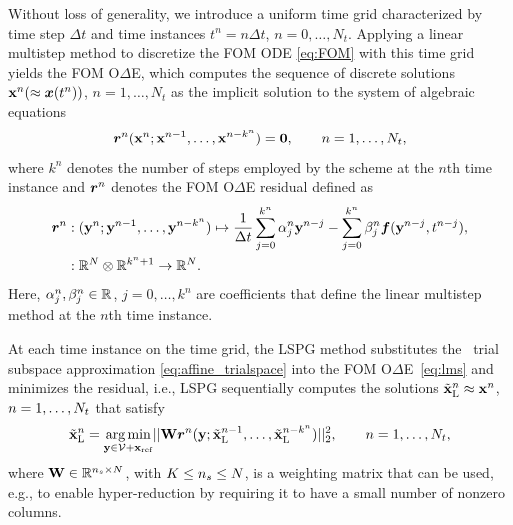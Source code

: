 \documentclass[3p,computermodern,10pt]{elsarticle}
\begin{document}
Without loss of generality, we introduce a uniform time
grid characterized by time step $\Delta t$ and time instances
$t^n = n\Delta
t$, $n=0,\ldots,N_t$.
Applying a linear multistep method to discretize the FOM ODE \eqref{eq:FOM}
with this time grid
yields the FOM O$\Delta$E, which computes the sequence of discrete
solutions
${\mathbf{x}}^{n}( \approx {\boldsymbol x}(t^n))$, $n=1,\ldots,N_t$
as the implicit solution to the system of algebraic equations
\begin{equation}\label{eq:lms}
\boldsymbol r_{}^{n}
	({\mathbf{x}}^{n};{\mathbf{x}}^{n-1},\ldots,{\mathbf{x}}^{n-k^n})
	= \boldsymbol 0,\qquad n=1,\ldots,N_t,
\end{equation}
where  $k^n$ denotes the number of steps employed by the scheme at the $n$th
time instance and 
$\boldsymbol r_{}^{n}$ denotes the FOM O$\Delta$E residual defined as
\begin{align*}
\boldsymbol r_{}^{n} &: (\mathbf{y}^{n};\mathbf{y}^{n-1},\ldots,\mathbf{y}^{n-k^n}) \mapsto  \frac{1}{\Delta t} \sum_{j=0}^{k^n} \alpha^n_j \mathbf{y}^{n-j} -  \sum_{j=0}^{k^n} \beta^n_j \boldsymbol f(\mathbf{y}^{n-j},t^{n-j}),
\\
&: \mathbb{R}^{N} \otimes \mathbb{R}^{k^n + 1} \rightarrow \mathbb{R}^{N}.
\end{align*} 
Here, $\alpha^n_j,\beta^n_j\in\mathbb{R}^{}$, $j=0,\ldots,k^n$ are coefficients
that define the linear multistep method at the $n$th time instance.

At each time instance on the time grid, the LSPG method substitutes the \spatialAcronym\ trial subspace approximation
\eqref{eq:affine_trialspace} into the FOM O$\Delta$E~\eqref{eq:lms} and
minimizes the residual, i.e., LSPG sequentially computes the solutions
$\tilde{\mathbf{x}}_{\text{L}}^n \approx {\mathbf{x}}^{n}$, $n=1,\ldots,
N_t$ that satisfy
\begin{equation*}
\tilde{\mathbf{x}}_{\text{L}}^n = \underset{\mathbf{y} \in \mathcal{V } + \mathbf{x}_\text{ref} }{\text{arg\,min}}|| \mathbf{W}\boldsymbol r_{}^{n} (\mathbf{y}; \tilde{\mathbf{x}}_{\text{L}}^{n-1},\ldots,\tilde{\mathbf{x}}_{\text{L}}^{n-k^n}) ||_2^2, \qquad n = 1,\ldots,N_t,
\end{equation*}
where 
$\mathbf{W} \in \mathbb{R}^{n_s \times N}$, with $K
\le n_s \le N$, is a weighting matrix that can be used, e.g., to
enable hyper-reduction by requiring it to have a small number of nonzero
columns. 
\end{document}
